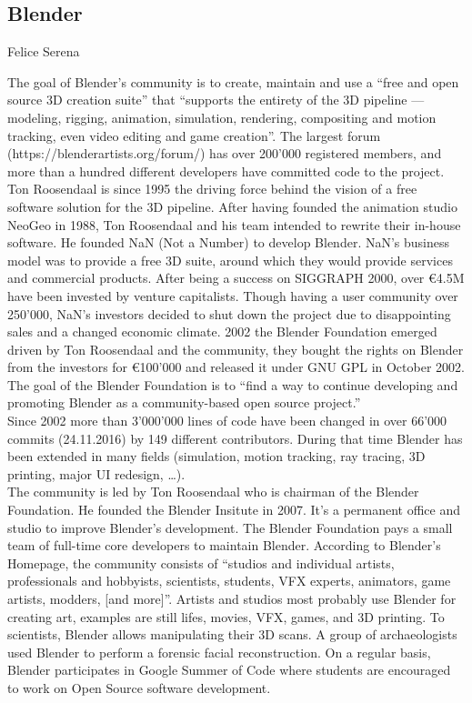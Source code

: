 \subsection{Blender}{Felice Serena}

The goal of Blender's community is to create, maintain and use a ``free and open source 3D creation suite'' that ``supports the entirety of the 3D pipeline — modeling, rigging, animation, simulation, rendering, compositing and motion tracking, even video editing and game creation''. The largest forum (https://blenderartists.org/forum/) has over 200'000 registered members, and more than a hundred different developers have committed code to the project. Ton Roosendaal is since 1995 the driving force behind the vision of a free software solution for the 3D pipeline. After having founded the animation studio NeoGeo in 1988\cite{blender-manual-history}, Ton Roosendaal and his team intended to rewrite their in-house software. He founded NaN (Not a Number) to develop Blender. NaN's business model was to provide a free 3D suite, around which they would provide services and commercial products. After being a success on SIGGRAPH 2000, over €4.5M have been invested by venture capitalists. Though having a user community over 250'000, NaN's investors decided to shut down the project due to disappointing sales and a changed economic climate. 2002 the Blender Foundation emerged driven by Ton Roosendaal and the community, they bought the rights on Blender from the investors for €100'000 and released it under GNU GPL\cite{blender-license} in October 2002. The goal of the Blender Foundation is to ``find a way to continue developing and promoting Blender as a community-based open source project.'' \cite{blender-official-history} \\

Since 2002 more than 3'000'000 lines of code have been changed in over 66'000 commits (24.11.2016) by 149 different contributors. During that time Blender has been extended in many fields (simulation, motion tracking, ray tracing, 3D printing, major UI redesign, …). \\

The community is led by Ton Roosendaal who is chairman of the Blender Foundation. 
He founded the Blender Insitute in 2007. It's a permanent office and studio to improve Blender's development.\cite{blender-foundation-history} The Blender Foundation pays a small team of full-time core developers to maintain Blender.\cite{blender-development-support} According to Blender's Homepage\cite{blender-homepage}, the community consists of ``studios and individual artists, professionals and hobbyists, scientists, students, VFX experts, animators, game artists, modders, [and more]''. Artists and studios most probably use Blender for creating art, examples are still lifes, movies, VFX, games, and 3D printing. To scientists, Blender allows manipulating their 3D scans. A group of archaeologists used Blender to perform a forensic facial reconstruction.\cite{blender-facial-reconstruction} On a regular basis, Blender participates in Google Summer of Code where students are encouraged to work on Open Source software development.\cite{blender-gsoc-2016} \\

